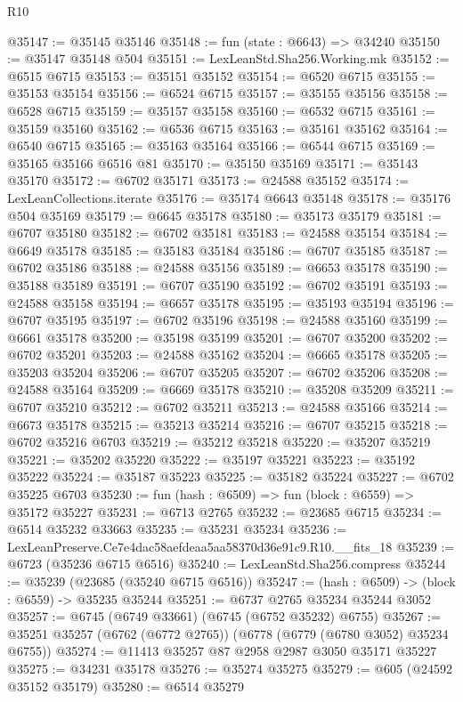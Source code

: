 \begin{lexlean}{R10}
\begin{coremodule}
@35147 := @35145 @35146
@35148 := fun (state : @6643) => @34240
@35150 := @35147 @35148 @504
@35151 := LexLeanStd.Sha256.Working.mk
@35152 := @6515 @6715
@35153 := @35151 @35152
@35154 := @6520 @6715
@35155 := @35153 @35154
@35156 := @6524 @6715
@35157 := @35155 @35156
@35158 := @6528 @6715
@35159 := @35157 @35158
@35160 := @6532 @6715
@35161 := @35159 @35160
@35162 := @6536 @6715
@35163 := @35161 @35162
@35164 := @6540 @6715
@35165 := @35163 @35164
@35166 := @6544 @6715
@35169 := @35165 @35166 @6516 @81
@35170 := @35150 @35169
@35171 := @35143 @35170
@35172 := @6702 @35171
@35173 := @24588 @35152
@35174 := LexLeanCollections.iterate
@35176 := @35174 @6643 @35148
@35178 := @35176 @504 @35169
@35179 := @6645 @35178
@35180 := @35173 @35179
@35181 := @6707 @35180
@35182 := @6702 @35181
@35183 := @24588 @35154
@35184 := @6649 @35178
@35185 := @35183 @35184
@35186 := @6707 @35185
@35187 := @6702 @35186
@35188 := @24588 @35156
@35189 := @6653 @35178
@35190 := @35188 @35189
@35191 := @6707 @35190
@35192 := @6702 @35191
@35193 := @24588 @35158
@35194 := @6657 @35178
@35195 := @35193 @35194
@35196 := @6707 @35195
@35197 := @6702 @35196
@35198 := @24588 @35160
@35199 := @6661 @35178
@35200 := @35198 @35199
@35201 := @6707 @35200
@35202 := @6702 @35201
@35203 := @24588 @35162
@35204 := @6665 @35178
@35205 := @35203 @35204
@35206 := @6707 @35205
@35207 := @6702 @35206
@35208 := @24588 @35164
@35209 := @6669 @35178
@35210 := @35208 @35209
@35211 := @6707 @35210
@35212 := @6702 @35211
@35213 := @24588 @35166
@35214 := @6673 @35178
@35215 := @35213 @35214
@35216 := @6707 @35215
@35218 := @6702 @35216 @6703
@35219 := @35212 @35218
@35220 := @35207 @35219
@35221 := @35202 @35220
@35222 := @35197 @35221
@35223 := @35192 @35222
@35224 := @35187 @35223
@35225 := @35182 @35224
@35227 := @6702 @35225 @6703
@35230 := fun (hash : @6509) => fun (block : @6559) => @35172 @35227
@35231 := @6713 @2765
@35232 := @23685 @6715
@35234 := @6514 @35232 @33663
@35235 := @35231 @35234
@35236 := LexLeanPreserve.Ce7e4dac58aefdeaa5aa58370d36e91c9.R10.__fits_18
@35239 := @6723 (@35236 @6715 @6516)
@35240 := LexLeanStd.Sha256.compress
@35244 := @35239 (@23685 (@35240 @6715 @6516))
@35247 := (hash : @6509) -> (block : @6559) -> @35235 @35244
@35251 := @6737 @2765 @35234 @35244 @3052
@35257 := @6745 (@6749 @33661) (@6745 (@6752 @35232) @6755)
@35267 := @35251 @35257 (@6762 (@6772 @2765)) (@6778 (@6779 (@6780 @3052) @35234 @6755))
@35274 := @11413 @35257 @87 @2958 @2987 @3050 @35171 @35227
@35275 := @34231 @35178
@35276 := @35274 @35275
@35279 := @605 (@24592 @35152 @35179)
@35280 := @6514 @35279

\end{coremodule}
\end{lexlean}
